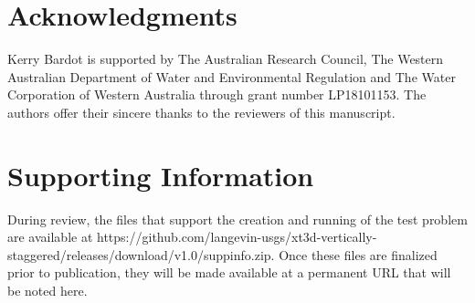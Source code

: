 \documentclass{article}
\begin{document}
\section{Acknowledgments}
Kerry Bardot is supported by The Australian Research Council, The Western Australian Department of Water and Environmental Regulation and The Water Corporation of Western Australia through grant number LP18101153. The authors offer their sincere thanks to the reviewers of this manuscript.

\section{Supporting Information}
During review, the files that support the creation and running of the test problem are available at https://github.com/langevin-usgs/xt3d-vertically-staggered/releases/download/v1.0/suppinfo.zip. Once these files are finalized prior to publication, they will be made available at a permanent URL that will be noted here.


\end{document}
